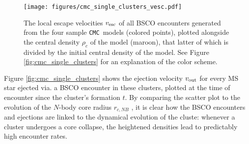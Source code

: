\documentclass[twocolumn]{aastex631}
\newcommand{\CMC}{\texttt{CMC}}
\begin{document}
\begin{figure}
    \centering
    \texttt{[image: figures/cmc\_single\_clusters\_vesc.pdf]}
    \caption{
        The local escape velocities $v_{\rm esc}$ of all BSCO encounters generated from the four sample \CMC\ models (colored points), plotted alongside the central density $\rho_c$ of the model (maroon), that latter of which is divided by the initial central density of the model.
        See Figure \ref{fig:cmc_single_clusters} for an explanation of the color scheme.
    }
    \label{fig:cmc_single_clusters_vesc}
\end{figure}

Figure \ref{fig:cmc_single_clusters} shows the ejection velocity $v_{\rm out}$ for every MS star ejected via. a BSCO encounter in these clusters, plotted at the time of encounter since the cluster's formation $t$.
By comparing the scatter plot to the evolution of the $N$-body core radius $r_{c, NB}$ \citep{1985ApJ...298...80C}, it is clear how the BSCO encounters and ejections are linked to the dynamical evolution of the cluste: whenever a cluster undergoes a core collapse, the heightened densities lead to predictably high encounter rates.

\begin{figure*}
    \caption{
        Scatter plots of the cluster ejection velocity $V_{rm out}$ versus encounter time $t$ for every escaping object from the integrated encounters for the four sample \CMC\ models (see the beginning of \S\ref{subsec:single_clusters} for details).
        The histograms show the same data in 1D.
        The different types of encounters are color-coded: encounters between a binary star and a CO are in red,
        encounters between a mixed binary (1 star and 1 CO) and a CO are in blue, encounters between a mixed binary and a star are in yellow, and encounters between a CO binary and a star are in purple.
        The $N$-body core radius $r_{c, NB}$ \citep{1985ApJ...298...80C} of the model is plotted in maroon over the timewise histogram.
    }
    \label{fig:cmc_single_clusters}
\end{figure*}
\end{document}
